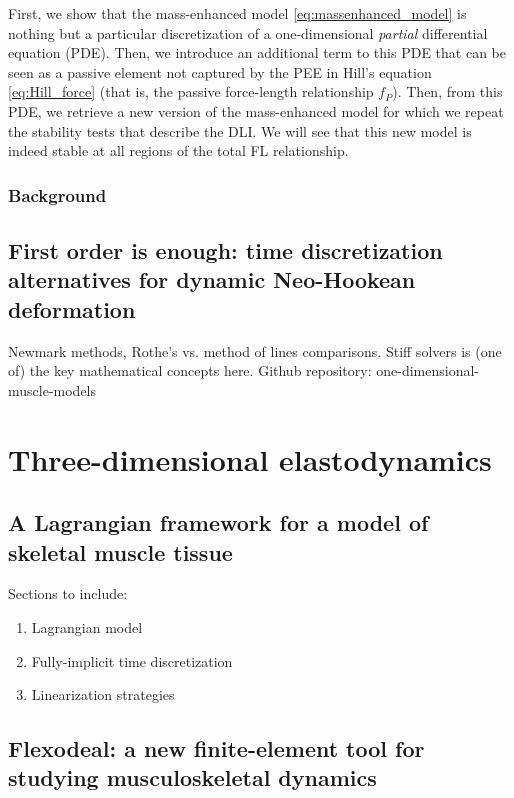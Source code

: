 \documentclass{sfuthesis}
\numberwithin{equation}{chapter}
\numberwithin{figure}{chapter}
\numberwithin{table}{chapter}
\theoremstyle{definition}
\begin{document}
First, we show that the mass-enhanced model \eqref{eq:massenhanced_model} is nothing but a particular discretization of a one-dimensional \textit{partial} differential equation (PDE). Then, we introduce an additional term to this PDE that can be seen as a passive element not captured by the PEE in Hill's equation \eqref{eq:Hill_force} (that is, the passive force-length relationship $f_P$). Then, from this PDE, we retrieve a new version of the mass-enhanced model for which we repeat the stability tests that describe the DLI. We will see that this new model is indeed stable at all regions of the total FL relationship.

\section{Background}


\chapter{First order is enough: time discretization alternatives for dynamic Neo-Hookean deformation}

Newmark methods, Rothe's vs. method of lines comparisons. Stiff solvers is (one of) the key mathematical concepts here.
Github repository: one-dimensional-muscle-models

\part{Three-dimensional elastodynamics}

\chapter{A Lagrangian framework for a model of skeletal muscle tissue}

Sections to include:
\begin{enumerate}
    \item Lagrangian model
    \item Fully-implicit time discretization
    \item Linearization strategies
\end{enumerate}

\chapter{Flexodeal: a new finite-element tool for studying musculoskeletal dynamics}
\end{document}

